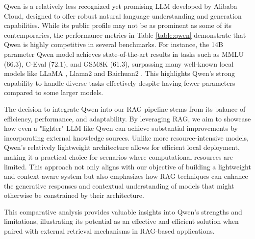 Qwen \cite{bai2023qwen} is a relatively less recognized yet promising LLM developed by Alibaba Cloud, designed to offer robust natural language understanding and generation capabilities. While its public profile may not be as prominent as some of its contemporaries, the performance metrics in Table \ref{table:qwen} demonstrate that Qwen is highly competitive in several benchmarks. For instance, the 14B parameter Qwen model achieves state-of-the-art results in tasks such as MMLU (66.3), C-Eval (72.1), and GSM8K (61.3), surpassing many well-known local models like LLaMA \cite{llama}, Llama2 \cite{llama2} and Baichuan2 \cite{baichuan2}. This highlights Qwen’s strong capability to handle diverse tasks effectively despite having fewer parameters compared to some larger models.

The decision to integrate Qwen into our RAG pipeline stems from its balance of efficiency, performance, and adaptability. By leveraging RAG, we aim to showcase how even a "lighter" LLM like Qwen can achieve substantial improvements by incorporating external knowledge sources. Unlike more resource-intensive models, Qwen's relatively lightweight architecture allows for efficient local deployment, making it a practical choice for scenarios where computational resources are limited. This approach not only aligns with our objective of building a lightweight and context-aware system but also emphasizes how RAG techniques can enhance the generative responses and contextual understanding of models that might otherwise be constrained by their architecture.

This comparative analysis provides valuable insights into Qwen’s strengths and limitations, illustrating its potential as an effective and efficient solution when paired with external retrieval mechanisms in RAG-based applications.


